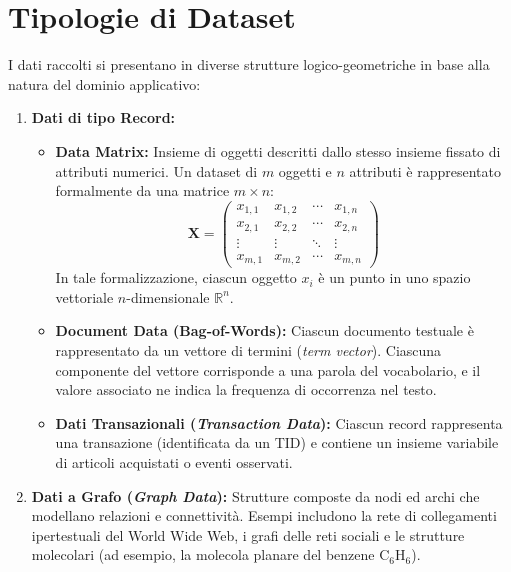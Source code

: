 \section{Tipologie di Dataset}

I dati raccolti si presentano in diverse strutture logico-geometriche in base alla natura del dominio applicativo:

\begin{enumerate}
    \item \textbf{Dati di tipo Record:}
    \begin{itemize}
        \item \textbf{Data Matrix:} Insieme di oggetti descritti dallo stesso insieme fissato di attributi numerici. Un dataset di $m$ oggetti e $n$ attributi è rappresentato formalmente da una matrice $m \times n$:
        \begin{equation}
        \mathbf{X} = \begin{pmatrix}
        x_{1,1} & x_{1,2} & \cdots & x_{1,n} \\
        x_{2,1} & x_{2,2} & \cdots & x_{2,n} \\
        \vdots & \vdots & \ddots & \vdots \\
        x_{m,1} & x_{m,2} & \cdots & x_{m,n}
        \end{pmatrix}
        \end{equation}
        In tale formalizzazione, ciascun oggetto $x_i$ è un punto in uno spazio vettoriale $n$-dimensionale $\mathbb{R}^n$.
        \item \textbf{Document Data (Bag-of-Words):} Ciascun documento testuale è rappresentato da un vettore di termini (\textit{term vector}). Ciascuna componente del vettore corrisponde a una parola del vocabolario, e il valore associato ne indica la frequenza di occorrenza nel testo.
        \item \textbf{Dati Transazionali (\textit{Transaction Data}):} Ciascun record rappresenta una transazione (identificata da un TID) e contiene un insieme variabile di articoli acquistati o eventi osservati.
    \end{itemize}

    \item \textbf{Dati a Grafo (\textit{Graph Data}):} Strutture composte da nodi ed archi che modellano relazioni e connettività. Esempi includono la rete di collegamenti ipertestuali del World Wide Web, i grafi delle reti sociali e le strutture molecolari (ad esempio, la molecola planare del benzene $\text{C}_6\text{H}_6$).


\end{enumerate}
